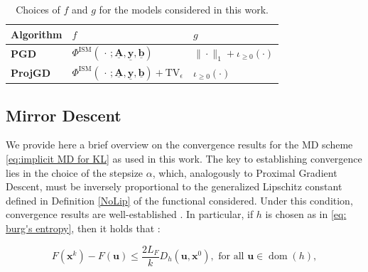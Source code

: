 \documentclass[letterpaper]{article}
\DeclareMathOperator*{\argmin}{arg\,min}
\newcommand{\x}{\mathbf{x}}
\newcommand{\A}{\mathbf{A}}
\newcommand{\y}{\mathbf{y}}
\begin{document}
\begin{table}[htbp]
\centering
\caption{Choices of $f$ and $g$ for the models considered in this work.}
\label{tab:scelte_f_g}
\vspace{2mm} 
\begin{tabular}{lll}
\toprule
\textbf{Algorithm} & \textbf{$f$} & \textbf{$g$} \\
\midrule
\textbf{PGD} & $\Phi^{\text{ISM}}(\,\cdot\,; \underline{\mathbf{A}}, \underline{\mathbf{y}}, 
\underline{\mathbf{b}})$ & $\|\cdot\|_1+ \iota_{\geq 0}(\cdot) $ \\
\addlinespace %
\textbf{ProjGD} & $\Phi^{\text{ISM}}(\,\cdot\,; \underline{\mathbf{A}}, \underline{\mathbf{y}}, 
\underline{\mathbf{b}}) + \text{TV}_{\epsilon}$       & $\iota_{\geq 0}(\cdot)$ \\
\bottomrule
\end{tabular}
\end{table}

\subsection{Mirror Descent}



We provide here a brief overview on the convergence results for the MD scheme \eqref{eq:implicit MD for KL} as used in this work. The key to establishing convergence lies in the choice of the stepsize $\alpha$, which, analogously to Proximal Gradient Descent, must be inversely proportional to the generalized Lipschitz constant defined in Definition \ref{NoLip} of the functional considered. Under this condition, convergence results are well-established \cite{nolip, Bolte2018, RelativeSmoothness}. In particular, if $h$ is chosen as in \ref{eq: burg's entropy}, then it holds that \cite[Theorem 1]{nolip}:

\begin{equation}
    F(\mathbf{x}^k) - F (\mathbf{u}) \leq \frac{2L_F}{k} D_{h}(\mathbf{u}, \mathbf{x}^0), \text{ for all } \mathbf{u} \in \operatorname{dom}(h),
\end{equation}
\end{document}
